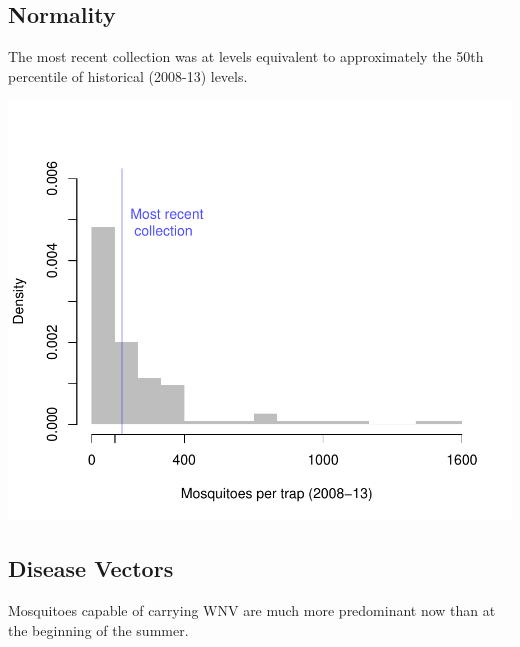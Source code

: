 \documentclass{article}
\begin{document}
\begin{multicols}{2} 


\vfill
\columnbreak
\subsection*{Normality}
The most recent collection was at levels equivalent to approximately the 50th percentile of historical (2008-13) levels.

\includegraphics{mosquitoReport-004}

\vfill
\columnbreak



\subsection*{Disease Vectors}

Mosquitoes capable of carrying WNV are much more predominant now than at the beginning of the summer.


\end{multicols}
\end{document}
